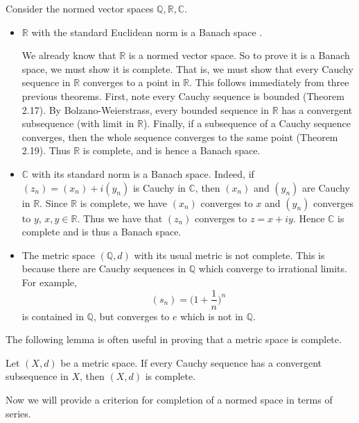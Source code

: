 \begin{example}
Consider the normed vector spaces $\mathbb{Q}, \mathbb{R}, \mathbb{C}$.
\begin{itemize}
\item $\mathbb{R}$ with the standard Euclidean norm is a Banach space \cite{nthubanach}. 

We already know that $\mathbb{R}$ is a normed vector space.  So to prove it is a Banach space, we must show it is complete.  That is, we must show that every Cauchy sequence in $\mathbb{R}$ converges to a point in $\mathbb{R}$.  This follows immediately from three previous theorems.  First, note every Cauchy sequence is bounded (Theorem 2.17).  By Bolzano-Weierstrass, every bounded sequence in $\mathbb{R}$ has a convergent subsequence (with limit in $\mathbb{R}$).  Finally, if a subsequence of a Cauchy sequence converges, then the whole sequence converges to the same point (Theorem 2.19).  Thus $\mathbb{R}$ is complete, and is hence a Banach space.

\item $\mathbb{C}$ with its standard norm is a Banach space.  Indeed, if $(z_n) = (x_n) + i(y_n)$ is Cauchy in $\mathbb{C}$, then $(x_n)$ and $(y_n)$ are Cauchy in $\mathbb{R}$.  Since $\mathbb{R}$ is complete, we have $(x_n)$ converges to $x$ and $(y_n)$ converges to $y$, $x, y \in \mathbb{R}$.  Thus we have that $(z_n)$ converges to $z = x + iy$.  Hence $\mathbb{C}$ is complete and is thus a Banach space.

\item The metric space $(\mathbb{Q}, d)$ with its usual metric is not complete.  This is because there are Cauchy sequences in $\mathbb{Q}$ which converge to irrational limits.  For example, 
\[(s_n) = \biggl ( 1 + \frac{1}{n} \biggr )^n\]
is contained in $\mathbb{Q}$, but converges to $e$ which is not in $\mathbb{Q}$.
\end{itemize}
\end{example}

The following lemma is often useful in proving that a metric space is complete.

\begin{lemma}
Let $(X,d)$ be a metric space.  If every Cauchy sequence has a convergent subsequence in $X$, then $(X,d)$ is complete.
\end{lemma}

Now we will provide a criterion for completion of a normed space in terms of series.

